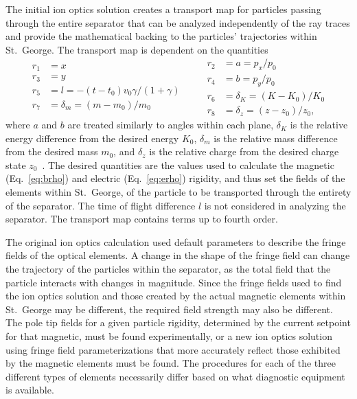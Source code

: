 The initial ion optics solution creates a transport map for particles passing
through the entire separator that can be analyzed independently of the ray
traces and provide the mathematical backing to the particles' trajectories
within St.\ George. The transport map is dependent on the quantities
\begin{equation}
    \label{eq:cosyvars}
    \begin{split}
        r_1 &= x \\
        r_3 &= y \\
        r_5 &= l = -(t - t_0)v_0\gamma/(1 + \gamma) \\
        r_7 &= \delta_m = (m - m_0)/m_0
    \end{split}
    \quad\quad
    \begin{split}
        r_2 &= a = p_x/p_0 \\
        r_4 &= b = p_y/p_0 \\
        r_6 &= \delta_K = (K - K_0)/K_0\\
        r_8 &= \delta_z = (z - z_0)/z_0,
    \end{split}
\end{equation}
where $a$ and $b$ are treated similarly to angles within each plane,
$\delta_K$ is the relative energy difference from the desired energy $K_0$,
$\delta_m$ is the relative mass difference from the desired mass $m_0$, and
$\delta_z$ is the relative charge from the desired charge state
$z_0$~\cite{COSY}.
The desired quantities are the values used to calculate the magnetic
(Eq.~\ref{eq:brho}) and electric (Eq.~\ref{eq:erho}) rigidity, and thus set the
fields of the elements within St.\ George,
of the particle to be transported through the entirety of the separator.
The time of flight difference $l$ is not considered in analyzing the separator.
The transport map contains terms up to fourth order.

The original ion optics calculation used default parameters to describe the
fringe fields of the optical elements. A change in the shape of the fringe
field can change the trajectory of the particles within the separator, as the
total field that the particle interacts with changes in magnitude. Since the
fringe fields used to find the ion optics solution and those created by the
actual magnetic elements within St.\ George may be different, the required
field strength may also be different. The pole tip fields for a given particle
rigidity, determined by the current setpoint for that magnetic, must be found
experimentally, or a new ion optics solution using fringe field
parameterizations that more accurately reflect those exhibited by the magnetic
elements must be found. The procedures for each of the three different types
of elements necessarily differ based on what diagnostic equipment is available.

